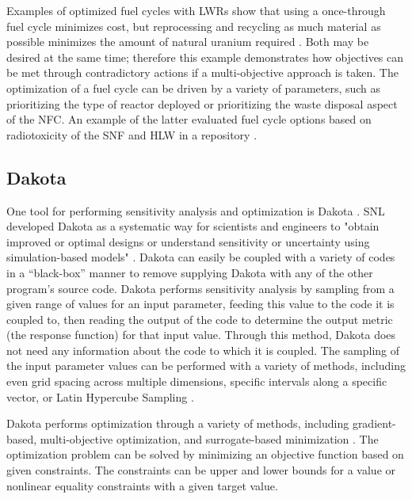 Examples of optimized fuel cycles with \glspl{LWR} show that using a
once-through fuel cycle minimizes cost, but reprocessing and recycling as 
much material as possible minimizes the amount of natural uranium 
required \cite{kunsch_nuclear_1987}. Both may 
be desired at the same time; therefore this example demonstrates how 
objectives can be met through contradictory actions if a multi-objective 
approach is taken. The optimization of a fuel cycle can be driven 
by a variety of parameters, such as prioritizing the type of reactor 
deployed or prioritizing the waste disposal 
aspect of the \gls{NFC}. An example of the latter 
evaluated fuel cycle options based on radiotoxicity of the \gls{SNF} and 
\gls{HLW} in a repository \cite{del_cul_advanced_2010}. 


\subsection{Dakota}
One tool for performing sensitivity analysis and optimization is 
Dakota \cite{adams_dakota_2019}.
\gls{SNL} developed Dakota as a systematic way for scientists and 
engineers to "obtain improved or optimal designs or understand sensitivity
or uncertainty using simulation-based models" \cite{adams_dakota_2019}.
Dakota can easily be coupled with a variety of codes in a ``black-box'' 
manner
to remove supplying Dakota with any of the other program's source code.
Dakota performs sensitivity analysis by sampling from a given range of 
values for an input parameter, feeding this value to the code it is 
coupled to, then reading the output of the code to determine the output 
metric (the response function) for that input value. Through this method, 
Dakota does not need any information about the code to which it is coupled. 
The sampling of the input parameter values can be performed with a variety of 
methods, including even grid spacing across multiple dimensions, specific 
intervals along a specific vector, or Latin Hypercube Sampling 
\cite{adams_dakota_2019}.

Dakota performs optimization through a variety of methods, including
gradient-based, multi-objective optimization, and surrogate-based 
minimization \cite{adams_dakota_2019}. The optimization problem can be 
solved by minimizing an objective function based on given constraints. The 
constraints can be upper and lower bounds for a value or nonlinear 
equality constraints with a given target value. 

